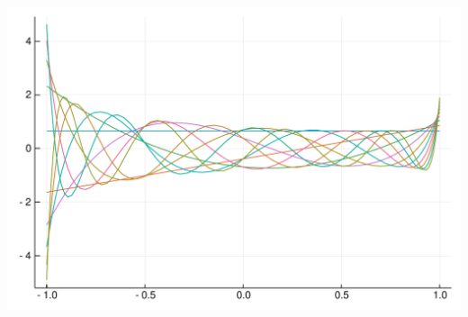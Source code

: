 \documentclass[12pt,a4paper]{article}
\begin{document}
\includegraphics[width=\linewidth]{figures/Lecture20_3_1.pdf}
\end{document}
